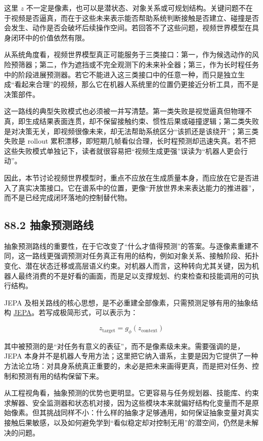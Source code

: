 这里 \(z\) 不一定是像素，也可以是潜状态、对象关系或可规划结构。关键问题不在于视频是否逼真，而在于这些未来表示能否帮助系统判断接触是否建立、碰撞是否会发生、动作是否会破坏后续操作空间。若回答不了这些问题，视频世界模型在具身闭环中的价值依然有限。

从系统角度看，视频世界模型真正可能服务于三类接口：第一，作为候选动作的风险预筛器；第二，作为遮挡或不完全观测下的未来补全器；第三，作为长时程任务中的阶段进展预测器。若它不能进入这三类接口中的任意一种，而只是独立生成“看起来合理”的视频，那么它在机器人系统里的位置仍更接近分析工具，而不是决策部件。

这一路线的典型失败模式也必须被一并写清楚。第一类失败是视觉逼真但物理不真，即生成结果表面连贯，却不保留接触约束、惯性后果或碰撞逻辑；第二类失败是对决策无关，即视频很像未来，却无法帮助系统区分“该抓还是该绕开”；第三类失败是 rollout 累积漂移，即短期几帧看似合理，长时程预测却迅速失真。若不把这些失败模式单独记下，读者就很容易把“视频生成更强”误读为“机器人更会行动”。

因此，本节讨论视频世界模型时，重点不应放在生成质量本身，而应放在它是否进入了真实决策接口。它在谱系中的位置，更像“开放世界未来表达能力的推进器”，而不是已经完成闭环落地的控制替代物。

\subsection*{88.2 抽象预测路线}


抽象预测路线的重要性，在于它改变了“什么才值得预测”的答案。与逐像素重建不同，这一路线更强调预测对任务真正有用的结构，例如对象关系、接触阶段、拓扑变化、潜在状态迁移或高层语义约束。对机器人而言，这种转向尤其关键，因为机器人最终消费的不是好看的画面，而是足以支撑规划、约束检查和技能调用的可执行结构。

JEPA 及相关路线的核心思想，是不必重建全部像素，只需预测足够有用的抽象结构 \href{https://arxiv.org/abs/2301.08243}{JEPA}。若写成极简形式，可以表示为：

\begin{equation*}
\hat z_{\text{target}} = g_{\phi}(z_{\text{context}})
\end{equation*}

其中被预测的是“对任务有意义的表征”，而不是像素级未来。需要强调的是，JEPA 本身并不是机器人专用方法；这里把它纳入谱系，主要是因为它提供了一种方法论立场：对具身系统真正重要的，未必是把未来画得更真，而是把对任务、控制和预测有用的结构保留下来。

从工程视角看，抽象预测的优势也更明显。它更容易与任务规划器、技能库、约束求解器、安全监测器和状态机对接，因为这些模块本来就偏好结构化变量而不是原始像素。但其挑战同样不小：什么样的抽象才足够通用，如何保证抽象变量对真实接触后果敏感，以及如何避免学到“看似稳定却对控制无用”的潜空间，仍然是未解决的问题。

